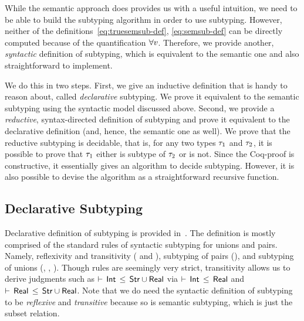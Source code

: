 While the semantic approach does provides us with a useful intuition,
we need to be able to build the subtyping algorithm in order to use subtyping.
However, neither of the definitions~\eqref{eq:truesemsub-def}, \eqref{eq:semsub-def} 
can be directly computed because of the quantification $\forall v$.
Therefore, we provide another, \emph{syntactic} 
definition of subtyping, which is
equivalent to the semantic one and also straightforward to implement.

We do this in two steps. 
First, we give an inductive definition that is handy to reason about,
called \emph{declarative} subtyping. 
We prove it equivalent to the semantic subtyping using the syntactic model
discussed above.
Second, we provide a \emph{reductive}, syntax-directed definition of subtyping
and prove it equivalent to the declarative definition 
(and, hence, the semantic one as well).
We prove that the reductive subtyping is decidable, 
that is, for any two types $\tau_1$ and $\tau_2$,
it is possible to prove that $\tau_1$ either is subtype of $\tau_2$ or is not.
Since the Coq-proof is constructive, it essentially gives an algorithm
to decide subtyping. However, it is also possible to devise the algorithm
as a straightforward recursive function.

\subsection{Declarative Subtyping}

Declarative definition of subtyping is provided in~.
The definition is mostly comprised of the standard rules
of syntactic subtyping for unions and pairs.
Namely, reflexivity and transitivity ( and ), 
subtyping of pairs (),
and subtyping of unions (, , ).
Though  rules are seemingly very strict, 
transitivity allows us to derive judgments such as
$\vdash \, \mathsf{Int} \, \leq \, \mathsf{Str} \cup \mathsf{Real}$ via
$\vdash \, \mathsf{Int} \, \leq \, \mathsf{Real}$ and $\vdash \, \mathsf{Real} \, \leq \, \mathsf{Str} \cup \mathsf{Real}$.
Note that we do need the syntactic definition of subtyping
to be \emph{reflexive} and \emph{transitive}
because so is semantic subtyping, which is just the subset relation.

